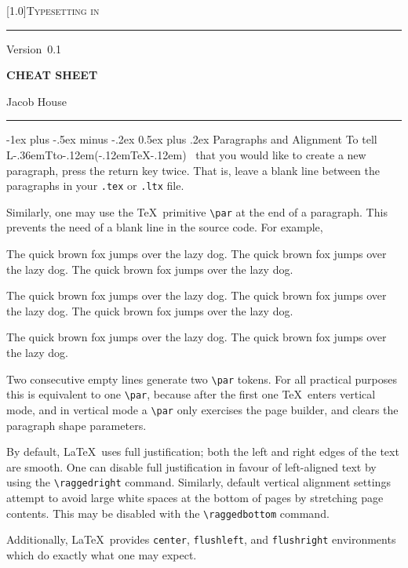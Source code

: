 \documentclass[10pt,landscape,letterpaper]{article}
\makeatletter
\def\version{0.1}
\newcommand{\header}{
		\bgroup
		\centering
		\scalebox{0.925}[1.0]{\LARGE\scshape Typesetting in \LaTeXe}
		\par\vskip 6pt
		\hrule \par\vskip 6pt
		\parbox{.25\columnwidth}{\sc Version \,\version\hfill}\parbox{.5\columnwidth}{\hfil\centering\large\bfseries CHEAT SHEET\hfil}\parbox{.25\columnwidth}{\hfill\sc Jacob House} \par\vskip 6pt
		\hrule\par\vskip 10pt
		\egroup
}
\def\laTeX{%
	L\kern-.36em{\sbox\z@ T\vbox to\ht\z@{\hbox{\check@mathfonts \fontsize\sf@size\z@\math@fontsfalse\selectfont A}}}\kern-.12em(\kern-.12em\TeX\kern-.12em)%
}
\renewcommand{\section}{\@startsection{section}{1}{0mm}%
	{.2ex}%
	{.2ex}%
	{\sffamily\bfseries}}
\renewcommand{\section}{\@startsection{section}{1}{0mm}%
	{-1ex plus -.5ex minus -.2ex}%
	{0.5ex plus .2ex}%
	{\normalfont\large\bfseries}}
\makeatother
\begin{document}
\small
\begin{multicols*}{3}
\header
\section{Paragraphs and Alignment}
To tell \laTeX\ that you would like to create a new paragraph, press the return key twice. That is, leave a blank line between the paragraphs in your \verb|.tex| or \verb|.ltx| file. 

Similarly, one may use the \TeX\ primitive \verb|\par| at the end of a paragraph. This prevents the need of a blank line in the source code. For example,
\begin{macrocode}
The quick brown fox jumps over the lazy dog. The quick brown fox jumps over the lazy dog. The quick brown fox jumps over the lazy dog.

The quick brown fox jumps over the lazy dog. The quick brown fox jumps over the lazy dog. The quick brown fox jumps over the lazy dog. \par
The quick brown fox jumps over the lazy dog. The quick brown fox jumps over the lazy dog. 
\end{macrocode}
Two consecutive empty lines generate two \verb|\par| tokens. For all practical purposes this is equivalent to one \verb|\par|, because after the first one \TeX\ enters vertical mode, and in vertical mode a \verb|\par| only exercises the page builder, and clears the paragraph shape parameters.

By default, \LaTeX\ uses full justification; both the left and right edges of the text are smooth. One can disable full justification in favour of left-aligned text by using the \verb|\raggedright| command. Similarly, default vertical alignment settings attempt to avoid large white spaces at the bottom of pages by stretching page contents. This may be disabled with the \verb|\raggedbottom| command.

Additionally, \LaTeX\ provides \verb|center|, \verb|flushleft|, and \verb|flushright| environments which do exactly what one may expect.


\end{multicols*}
\end{document}
